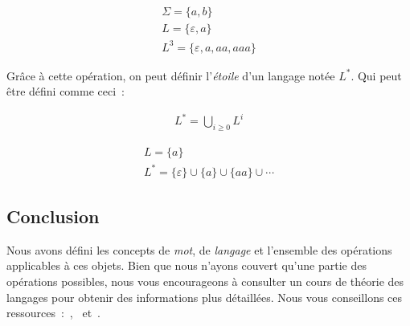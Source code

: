 \begin{example}
    \begin{gather*}
        \Sigma = \{a, b\} \\
        L = \{\varepsilon, a\} \\
        L^3 = \{\varepsilon, a, aa, aaa\}
    \end{gather*}
\end{example}

\begin{definition}
    Grâce à cette opération, on peut définir l'\textit{étoile} d'un langage
    notée \(L^*\). Qui peut être défini comme ceci~:

    \begin{gather*}
        L^* = \bigcup_{i \geq 0} L^i
    \end{gather*}
\end{definition}

\begin{example}
    \begin{gather*}
        L = \{a\} \\
        L^* = \{\varepsilon\} \cup \{a\} \cup \{aa\} \cup \cdots
    \end{gather*}
\end{example}

\subsection{Conclusion}

Nous avons défini les concepts de \textit{mot}, de \textit{langage} et
l'ensemble des opérations applicables à ces objets. Bien que nous n'ayons
couvert qu'une partie des opérations possibles, nous vous encourageons à
consulter un cours de théorie des langages pour obtenir des informations plus
détaillées. Nous vous conseillons ces
ressources~:~\cite{Harrison1978},~\cite{Autebert1994} et~\cite{Hopcroft2007}.
